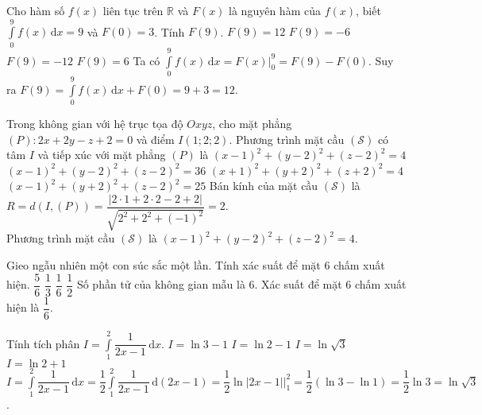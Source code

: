 \begin{ex}%
 Cho hàm số $f(x)$ liên tục trên $\mathbb{R}$ và $F(x)$ là nguyên hàm của $f(x)$, biết $\displaystyle\int\limits_0^9 f(x) \mathrm{\,d}x = 9$ và $F(0)=3$. Tính $F(9)$.
 \choice
  {\True $F(9) = 12$}
  {$F(9) = -6$}
  {$F(9) = -12$}
  {$F(9) = 6$}
 \loigiai
  {
  Ta có $\displaystyle\int\limits_0^9 f(x) \mathrm{\,d}x = F(x)\bigg|_0^9 = F(9)-F(0)$. Suy ra $F(9) = \displaystyle\int\limits_0^9 f(x) \mathrm{\,d}x + F(0) = 9 + 3 = 12$.
  }
\end{ex}


\begin{ex}%
 Trong không gian với hệ trục tọa độ $Oxyz$, cho mặt phẳng $(P)\colon 2x+2y-z+2=0$ và điểm $I(1;2;2)$. Phương trình mặt cầu $(\mathcal{S})$ có tâm $I$ và tiếp xúc với mặt phẳng $(P)$ là
 \choice
  {\True $(x-1)^2 + (y-2)^2 + (z-2)^2 = 4$}
  {$(x-1)^2 + (y-2)^2 + (z-2)^2 = 36$}
  {$(x+1)^2 + (y+2)^2 + (z+2)^2 = 4$}
  {$(x-1)^2 + (y+2)^2 + (z-2)^2 = 25$}
 \loigiai
  {
  Bán kính của mặt cầu $(\mathcal{S})$ là $R = d(I,(P)) = \dfrac{|2 \cdot 1 + 2 \cdot 2 - 2 + 2|}{\sqrt{2^2 + 2^2 + (-1)^2}} = 2$.\\
  Phương trình mặt cầu $(\mathcal{S})$ là $(x-1)^2 + (y-2)^2 + (z-2)^2 = 4$.
  }
\end{ex}


\begin{ex}%
 Gieo ngẫu nhiên một con súc sắc một lần. Tính xác suất để mặt $6$ chấm xuất hiện.
 \choice
  {$\dfrac{5}{6}$}
  {$\dfrac{1}{3}$}
  {\True $\dfrac{1}{6}$}
  {$\dfrac{1}{2}$}
 \loigiai
  {
  Số phần tử của không gian mẫu là $6$. Xác suất để mặt $6$ chấm xuất hiện là $\dfrac{1}{6}$.
  }
\end{ex}


\begin{ex}%
 Tính tích phân $I = \displaystyle\int\limits_1^2 \dfrac{1}{2x-1} \mathrm{\,d}x$.
 \choice
  {$I = \ln 3 - 1$}
  {$I = \ln 2 - 1$}
  {\True $I =\ln\sqrt{3}$}
  {$I = \ln 2 + 1$}
 \loigiai
  {
  $I = \displaystyle\int\limits_1^2 \dfrac{1}{2x-1} \mathrm{\,d}x = \dfrac{1}{2}\displaystyle\int\limits_1^2 \dfrac{1}{2x-1} \mathrm{\,d}(2x-1) = \dfrac{1}{2}\ln|2x-1|\bigg|_1^2 = \dfrac{1}{2}(\ln 3 - \ln 1) = \dfrac{1}{2}\ln 3 = \ln \sqrt{3}$.
  }
\end{ex}


